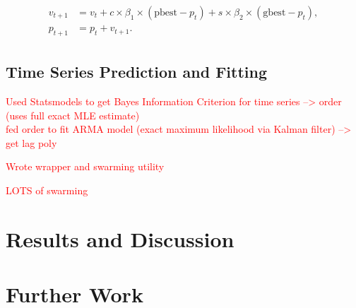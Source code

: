 \documentclass[oneside,12pt,openany]{book}
\newcommand\blankpage{
	\vfill
	\pagebreak
	\ifthispageodd{\null
		\vfill
		\vfill
		\clearpage}{}
}
\begin{document}
	\begin{align}
	\label{eqn:psoupdate}
	\begin{split}
	v_{t+1} &= v_{t}+c\times \beta_{1} \times (\text{pbest}-p_{t})+s\times \beta_{2} \times (\text{gbest}-p_{t}), \\
	p_{t+1} &= p_{t} + v_{t+1} .
	\end{split}
	\end{align}
	
	\section{Time Series Prediction and Fitting}
	
	\textcolor{red}{Used Statsmodels to get Bayes Information Criterion for time series --> order (uses full exact MLE estimate) \\ fed order to fit ARMA model (exact maximum likelihood via Kalman filter) --> get lag poly }

	
	\textcolor{red}{Wrote wrapper and swarming utility}
	
	\textcolor{red}{LOTS of swarming}
	
	\chapter{Results and Discussion}
	
	\chapter{Further Work}
	
	
	
	\blankpage
	\nocite{*}  %
	{}
	
	\appendices
	
\end{document}
